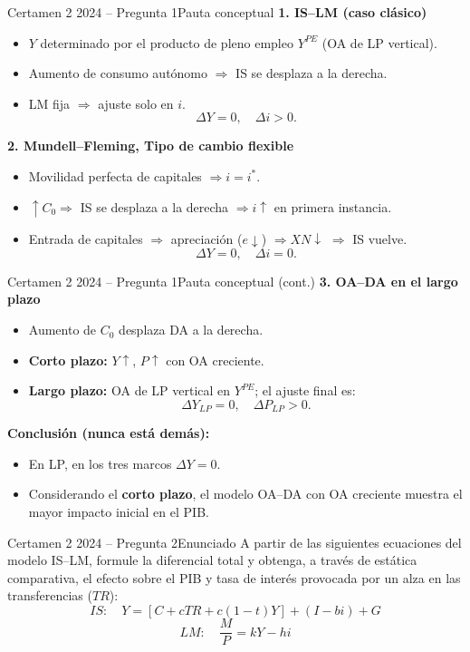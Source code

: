 \documentclass[aspectratio=169]{beamer}
\begin{document}
\begin{frame}{Certamen 2 2024 -- Pregunta 1}{Pauta conceptual}
\small
\textbf{1. IS--LM (caso clásico)}
\begin{itemize}
  \item $Y$ determinado por el producto de pleno empleo $Y^{PE}$ (OA de LP vertical).
  \item Aumento de consumo autónomo $\Rightarrow$ IS se desplaza a la derecha.
  \item LM fija $\Rightarrow$ ajuste solo en $i$.
  \[
  \Delta Y = 0, \quad \Delta i > 0.
  \]
\end{itemize}

\textbf{2. Mundell--Fleming, Tipo de cambio flexible}
\begin{itemize}
  \item Movilidad perfecta de capitales $\Rightarrow i = i^*$.
  \item $\uparrow C_0 \Rightarrow$ IS se desplaza a la derecha $\Rightarrow i \uparrow$ en primera instancia.
  \item Entrada de capitales $\Rightarrow$ apreciación ($e \downarrow$) $\Rightarrow XN \downarrow$ $\Rightarrow$ IS vuelve.
  \[
  \Delta Y = 0, \quad \Delta i = 0.
  \]
\end{itemize}
\end{frame}

\begin{frame}{Certamen 2 2024 -- Pregunta 1}{Pauta conceptual (cont.)}
\small
\textbf{3. OA--DA en el largo plazo}
\begin{itemize}
  \item Aumento de $C_0$ desplaza DA a la derecha.
  \item \textbf{Corto plazo:} $Y \uparrow$, $P \uparrow$ con OA creciente.
  \item \textbf{Largo plazo:} OA de LP vertical en $Y^{PE}$; el ajuste final es:
  \[
  \Delta Y_{LP} = 0,\quad \Delta P_{LP} > 0.
  \]
\end{itemize}

\textbf{Conclusión (nunca está demás):}
\begin{itemize}
  \item En LP, en los tres marcos $\Delta Y = 0$.
  \item Considerando el \textbf{corto plazo}, el modelo OA--DA con OA creciente muestra el mayor impacto inicial en el PIB.
\end{itemize}
\end{frame}

\begin{frame}{Certamen 2 2024 -- Pregunta 2}{Enunciado}
\small
A partir de las siguientes ecuaciones del modelo IS--LM, formule la diferencial total y obtenga, a través de estática comparativa, el efecto sobre el PIB y tasa de interés provocada por un alza en las transferencias ($TR$):
\[
IS:\quad Y = [C + cTR + c(1 - t)Y] + (I - bi) + G
\]
\[
LM:\quad \frac{M}{P} = kY - hi
\]
\end{frame}
\end{document}
